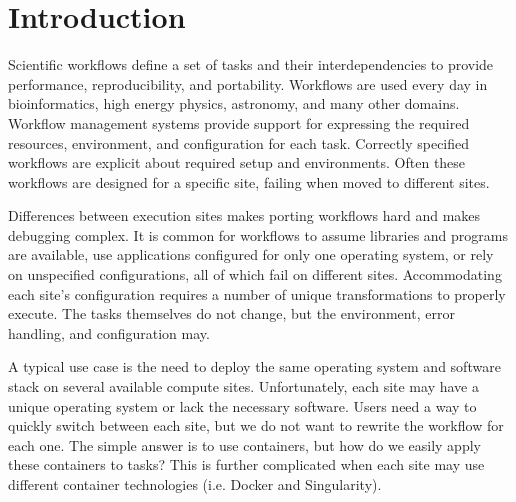 \documentclass[conference]{IEEEtran}
\begin{document}
\section{Introduction}


Scientific workflows define a set of tasks 
and their interdependencies to provide
performance, reproducibility, and portability.
Workflows are used every day in 
bioinformatics\cite{pmid20080505, pmid2231712, makeflow-examples, giardine2005galaxy, blankenberg2010galaxy, goecks2010galaxy}, 
high energy physics\cite{10.1007/978-3-540-24669-5_107, lobster-cluster-2015}, 
astronomy\cite{10.1007/978-3-540-28642-4_2}, 
and many other domains.
Workflow management systems provide support for 
expressing the required resources,
environment, and configuration for each task.
Correctly specified workflows are explicit
about required setup and environments.
Often these workflows are designed for a 
specific site, failing when
moved to different sites.

Differences between execution sites
makes porting workflows hard 
and makes debugging complex. 
It is common for workflows to
assume libraries and programs are available, 
use  applications configured for only one operating system,
or rely on unspecified configurations,
all of which fail on different sites.
Accommodating each site's configuration
requires a number of unique transformations to properly execute.
The tasks themselves do not change,
but the environment, error handling, and configuration 
may.

A typical use case is the 
need to deploy the same operating system and
software stack on several available
compute sites.
Unfortunately, each site may have a unique
operating system or lack the necessary software.
Users need a way to quickly switch between
each site, but we do not want to rewrite the 
workflow for each one.
The simple answer is to use containers,
but how do we easily apply these containers 
to tasks?
This is further complicated when each site
may use different container technologies
(i.e. Docker\cite{Merkel:2014:DLL:2600239.2600241}
and Singularity\cite{Singularity}).
\end{document}
